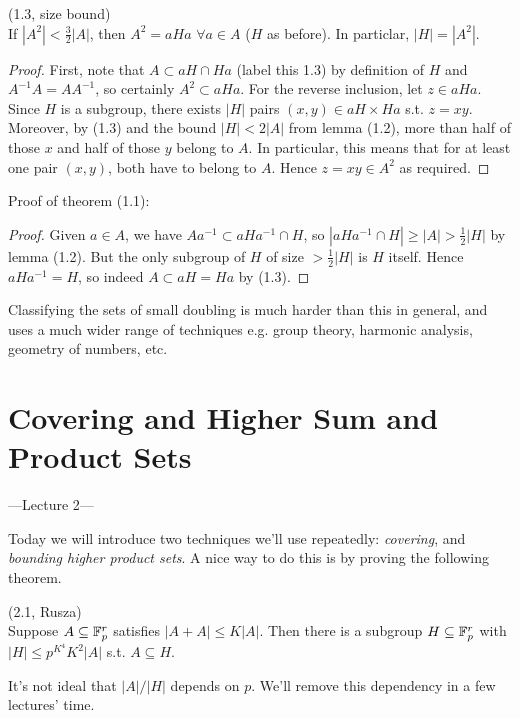 \documentclass[a4paper]{article}
\begin{document}
\begin{lemma} (1.3, size bound)\\
If $|A^2| < \frac{3}{2} |A|$, then $A^2 = aHa$ $\forall a \in A$ ($H$ as before). In particlar, $|H| = |A^2|$.
\begin{proof}
First, note that $A \subset aH \cap Ha$ (label this 1.3) by definition of $H$ and $A^{-1}A = AA^{-1}$, so certainly $A^2 \subset aHa$. For the reverse inclusion, let $z \in aHa$. Since $H$ is a subgroup, there exists $|H|$ pairs $(x,y) \in aH \times Ha$ s.t. $z=xy$. Moreover, by (1.3) and the bound $|H| < 2|A|$ from lemma (1.2), more than half of those $x$ and half of those $y$ belong to $A$. In particular, this means that for at least one pair $(x,y)$, both have to belong to $A$. Hence $z=xy \in A^2$ as required.
\end{proof}
\end{lemma}

Proof of theorem (1.1):
\begin{proof}
Given $a \in A$, we have $Aa^{-1} \subset aHa^{-1} \cap H$, so $|aHa^{-1} \cap H| \geq |A| > \frac{1}{2}|H|$ by lemma (1.2). But the only subgroup of $H$ of size $>\frac{1}{2}|H|$ is $H$ itself. Hence $aHa^{-1} = H$, so indeed $A \subset aH = Ha$ by (1.3).
\end{proof}

Classifying the sets of small doubling is much harder than this in general, and uses a much wider range of techniques e.g. group theory, harmonic analysis, geometry of numbers, etc.

\newpage 

\section{Covering and Higher Sum and Product Sets}

---Lecture 2---

Today we will introduce two techniques we'll use repeatedly: \emph{covering}, and \emph{bounding higher product sets}. A nice way to do this is by proving the following theorem.

\begin{thm} (2.1, Rusza)\\
    Suppose $A \subseteq \mathbb{F}^r_p$ satisfies $|A+A| \leq K|A|$. Then there is a subgroup $H \subseteq \mathbb{F}_p^r$ with $|H| \leq p^{K^4}K^2 |A|$ s.t. $A \subseteq H$.
\end{thm}

\begin{rem}
    It's not ideal that $|A|/|H|$ depends on $p$. We'll remove this dependency in a few lectures' time.
\end{rem}
\end{document}
